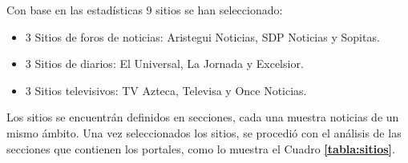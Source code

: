 Con base en las estadísticas 9 sitios se han seleccionado:

\begin{itemize}
    \item 3 Sitios de foros de noticias: Aristegui Noticias, SDP Noticias y Sopitas.
    \item 3 Sitios de diarios: El Universal, La Jornada y Excelsior.
    \item 3 Sitios televisivos: TV Azteca, Televisa y Once Noticias.
\end{itemize}
Los sitios se encuentrán definidos en secciones, cada una muestra noticias de un mismo ámbito. 
Una vez seleccionados los sitios, se procedió con el análisis de las secciones que contienen los portales, como 
lo muestra el Cuadro \textbf{\ref{tabla:sitios}}.
